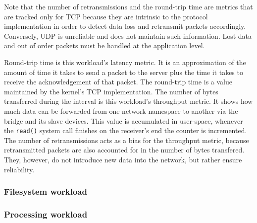 Note that the number of retransmissions and the round-trip time are metrics that are tracked only 
for TCP because they are intrinsic to the protocol implementation in order to detect data loss 
and retransmit packets accordingly. Conversely, UDP is unreliable and does not maintain such information. 
Lost data and out of order packets must be handled at the application level.

Round-trip time is this workload's latency metric. 
It is an approximation of the amount of time it takes to send a packet 
to the server plus the time it takes to receive the acknowledgement of that packet. 
The round-trip time is a value maintained by the kernel's TCP implementation.
The number of bytes transferred during the interval is this workload's throughput metric.
It shows how much data can be forwarded from one network namespace to another via the bridge
and its slave devices. This value is accumulated in user-space, whenever the \verb|read()| system call 
finishes on the receiver's end the counter is incremented.
The number of retransmissions acts as a bias for the throughput metric, because retransmitted 
packets are also accounted for in the number of bytes transfered. They, however, do not introduce 
new data into the network, but rather ensure reliability.

\subsubsection{Filesystem workload}

\subsubsection{Processing workload}
